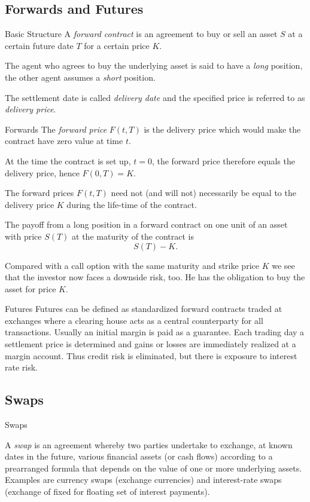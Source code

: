 \subsection{Forwards and Futures}

Basic Structure
	A {\it forward contract}
	is an agreement to buy or sell an asset $S$ at a certain future
	date $T$ for a certain price $K$.

	The agent who agrees to
	buy the underlying asset is said to have a {\it long} position,
	the other agent assumes a {\it short} position.
 
	The settlement
	date is called {\it delivery date} and the specified price is
	referred to as {\it delivery price}.


Forwards
	The {\it forward
	price} $F(t,T)$ is the delivery price which would make the
	contract have zero value at time $t$.
	
	At the time the contract is set up, $t=0$,
	the forward price therefore equals the delivery price, hence
	$F(0,T) = K$.

	The forward prices $F(t,T)$ need not (and will not)
	necessarily be equal to the delivery price $K$ during the
	life-time of the contract.

	The payoff from a long position in a forward contract on one unit
	of an asset with price $S(T)$ at the maturity of the contract is
	$$ S(T)-K.$$
 
	Compared with a call option with the same maturity
	and strike price $K$ we see that the investor now faces a downside
	risk, too. He has the obligation to buy the asset for price $K$.


Futures
	Futures can be defined as standardized forward contracts traded at exchanges where a clearing house acts as a central counterparty for all transactions.
	Usually an initial margin is paid as a guarantee.
	Each trading day a settlement price is determined and gains or losses are immediately realized at a margin account.
	Thus credit risk is eliminated, but there is exposure to interest rate risk.

\subsection{Swaps}

Swaps

A {\it swap} is an agreement whereby two parties
undertake to exchange, at known dates in the future, various
financial assets (or cash flows) according to a prearranged
formula that depends on the value of one or more underlying
assets. Examples are currency swaps (exchange currencies) and
interest-rate swaps (exchange of fixed for floating set of
interest payments).


